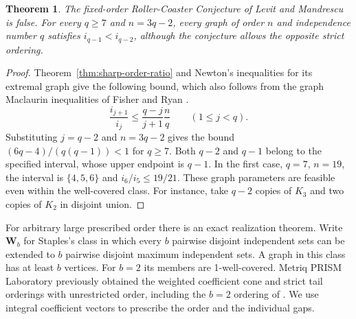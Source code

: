\documentclass[11pt,a4paper]{article}
\newtheorem{theorem}{Theorem}[section]
\begin{document}
\begin{theorem}\label{thm:overhauled-counterexample}
The fixed-order Roller-Coaster Conjecture of Levit and Mandrescu is false.
For every $q\ge7$ and $n=3q-2$, every graph of order $n$ and independence
number $q$ satisfies $i_{q-1}<i_{q-2}$, although the conjecture allows
the opposite strict ordering.
\end{theorem}
\begin{proof}
Theorem~\ref{thm:sharp-order-ratio} and Newton's inequalities for its
extremal graph give the following bound, which also follows from the
graph Maclaurin inequalities of Fisher and Ryan \cite{fisherryan}.
\begin{equation}\label{eq:order-constraint}
 \frac{i_{j+1}}{i_j}\le \frac{q-j}{j+1}\frac{n}{q}
 \qquad(1\le j<q).
\end{equation}
Substituting $j=q-2$ and $n=3q-2$ gives the bound
$(6q-4)/(q(q-1))<1$ for $q\ge7$. Both $q-2$ and $q-1$ belong to the
specified interval, whose upper endpoint is $q-1$. In the first case,
$q=7$, $n=19$, the interval is $\{4,5,6\}$ and $i_6/i_5\le19/21$.
These graph parameters are feasible even within the well-covered class.
For instance, take $q-2$ copies of $K_3$ and two copies of $K_2$ in
disjoint union.
\end{proof}

For arbitrary large prescribed order there is an exact realization
theorem. Write $\mathbf W_b$ for Staples's class in which every $b$
pairwise disjoint independent sets can be extended to $b$ pairwise
disjoint maximum independent sets. A graph in this class has at least
$b$ vertices. For $b=2$ its members are 1-well-covered. Metriq PRISM
Laboratory \cite{prismroller} previously obtained the weighted coefficient
cone and strict tail orderings with unrestricted order, including the
$b=2$ ordering of \cite[Conjecture~3.1]{levitroller}. We use integral
coefficient vectors to prescribe the order and the individual gaps.
\end{document}
